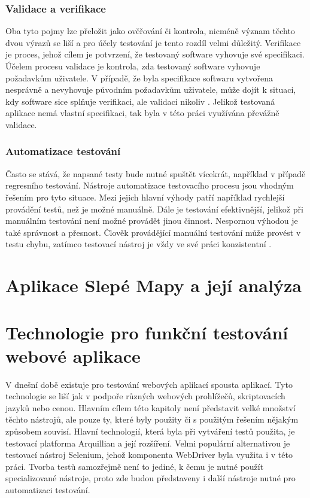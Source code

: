 \documentclass[
    color,   %
	table,   %
    twoside, %
]{fithesis3}
\begin{document}
  \subsection{Validace a verifikace}
  Oba tyto pojmy lze přeložit jako ověřování či kontrola, nicméně význam těchto dvou výrazů se liší a pro účely testování je tento rozdíl velmi důležitý. Verifikace je proces, jehož cílem je potvrzení, že testovaný software vyhovuje své specifikaci. Účelem procesu validace je kontrola, zda testovaný software vyhovuje požadavkům uživatele. V případě, že byla specifikace softwaru vytvořena nesprávně a nevyhovuje původním požadavkům uživatele, může dojít k situaci, kdy software sice splňuje verifikaci, ale validaci nikoliv \cite{Patton}. Jelikož testovaná aplikace nemá vlastní specifikaci, tak byla v této práci využívána převážně validace.
  
  \subsection{Automatizace testování}
  Často se stává, že napsané testy bude nutné spuštět vícekrát, například v případě regresního testování. Nástroje automatizace testovacího procesu jsou vhodným řešením pro tyto situace. Mezi jejich hlavní výhody patří například rychlejší provádění testů, než je možné manuálně. Dále je testování efektivnější, jelikož při manuálním testování není možné provádět jinou činnost. Nespornou výhodou je také správnost a přesnost. Člověk provádějící manuální testování může provést v testu chybu, zatímco testovací nástroj je vždy ve své práci konzistentní \cite{Patton}.
  
  \chapter{Aplikace Slepé Mapy a její analýza}
 
  \chapter{Technologie pro funkční testování webové aplikace}
V dnešní době existuje pro testování webových aplikací spousta aplikací. Tyto technologie se liší jak v podpoře různých webových prohlížečů, skriptovacích jazyků nebo cenou. Hlavním cílem této kapitoly není představit velké množství těchto nástrojů, ale pouze ty, které byly použity či s použitým řešením nějakým způsobem souvisí. Hlavní technologií, která byla při vytváření testů použita, je testovací platforma Arquillian a její rozšíření. Velmi populární alternativou je testovací nástroj Selenium, jehož komponenta WebDriver byla využita i v této práci. Tvorba testů samozřejmě není to jediné, k čemu je nutné použít specializované nástroje, proto zde budou představeny i další nástroje nutné pro automatizaci testování.
\end{document}
